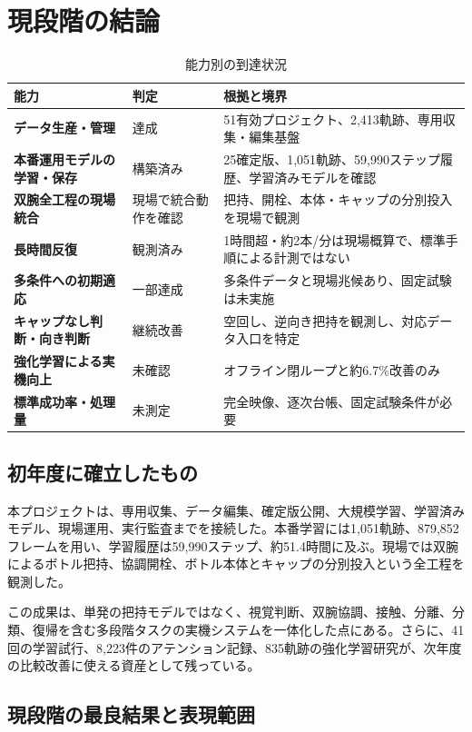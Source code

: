 \chapter{現段階の結論}

\begin{table}[H]
\centering
\caption{能力別の到達状況}
\begin{tabularx}{\textwidth}{>{\bfseries}p{35mm}p{30mm}X}
\toprule
能力 & 判定 & 根拠と境界\\
\midrule
データ生産・管理 & 達成 & 51有効プロジェクト、2,413軌跡、専用収集・編集基盤\\
本番運用モデルの学習・保存 & 構築済み & 25確定版、1,051軌跡、59,990ステップ履歴、学習済みモデルを確認\\
双腕全工程の現場統合 & 現場で統合動作を確認 & 把持、開栓、本体・キャップの分別投入を現場で観測\\
長時間反復 & 観測済み & 1時間超・約2本/分は現場概算で、標準手順による計測ではない\\
多条件への初期適応 & 一部達成 & 多条件データと現場兆候あり、固定試験は未実施\\
キャップなし判断・向き判断 & 継続改善 & 空回し、逆向き把持を観測し、対応データ入口を特定\\
強化学習による実機向上 & 未確認 & オフライン閉ループと約6.7\%改善のみ\\
標準成功率・処理量 & 未測定 & 完全映像、逐次台帳、固定試験条件が必要\\
\bottomrule
\end{tabularx}
\end{table}

\section{初年度に確立したもの}

本プロジェクトは、専用収集、データ編集、確定版公開、大規模学習、学習済みモデル、現場運用、実行監査までを接続した。本番学習には1,051軌跡、879,852フレームを用い、学習履歴は59,990ステップ、約51.4時間に及ぶ。現場では双腕によるボトル把持、協調開栓、ボトル本体とキャップの分別投入という全工程を観測した。

この成果は、単発の把持モデルではなく、視覚判断、双腕協調、接触、分離、分類、復帰を含む多段階タスクの実機システムを一体化した点にある。さらに、41回の学習試行、8,223件のアテンション記録、835軌跡の強化学習研究が、次年度の比較改善に使える資産として残っている。

\section{現段階の最良結果と表現範囲}

